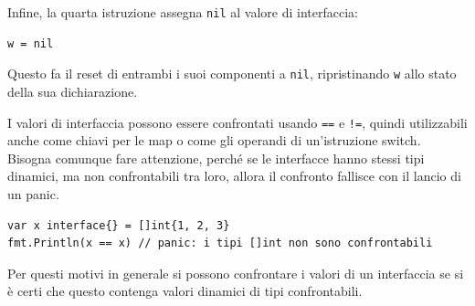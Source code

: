 \documentclass[../../thesis.tex]{subfiles}
\begin{document}
    \justifying\noindent Infine, la quarta istruzione assegna \verb"nil" al valore di interfaccia:
    \begin{lstlisting}[frame = single, label = {lst:lstlisting6-5.5}]
w = nil
    \end{lstlisting}
    Questo fa il reset di entrambi i suoi componenti a \verb"nil", ripristinando \verb"w" allo stato della sua dichiarazione.
    \hfill \vspace{12pt}

    I valori di interfaccia possono essere confrontati usando \verb"==" e \verb"!=", quindi utilizzabili anche come chiavi per le map o come gli operandi di un'istruzione switch.
    Bisogna comunque fare attenzione, perché se le interfacce hanno stessi tipi dinamici, ma non confrontabili tra loro, allora il confronto fallisce con il lancio di un panic.
    \begin{lstlisting}[frame = single, label = {lst:lstlisting6-5.6}]
var x interface{} = []int{1, 2, 3}
fmt.Println(x == x) // panic: i tipi []int non sono confrontabili
    \end{lstlisting}
    Per questi motivi in generale si possono confrontare i valori di un interfaccia se si è certi che questo contenga valori dinamici di tipi confrontabili.
\end{document}
